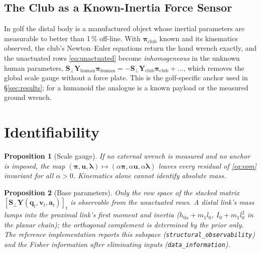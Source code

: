 \documentclass[11pt,a4paper]{article}
\newtheorem{proposition}{Proposition}
\newcommand{\bq}{\mathbf{q}}
\newcommand{\bv}{\mathbf{v}}
\newcommand{\ba}{\mathbf{a}}
\newcommand{\bu}{\mathbf{u}}
\newcommand{\bY}{\mathbf{Y}}
\newcommand{\bS}{\mathbf{S}}
\newcommand{\bpi}{\boldsymbol{\pi}}
\newcommand{\blambda}{\boldsymbol{\lambda}}
\begin{document}
\subsection{The Club as a Known-Inertia Force Sensor}
In golf the distal body is a manufactured object whose inertial parameters are
measurable to better than 1\,\% off-line.  With $\bpi_{\mathrm{club}}$ known
and its kinematics observed, the club's Newton--Euler equations return the
hand wrench exactly, and the unactuated rows \eqref{eq:unactuated} become
\emph{inhomogeneous} in the unknown human parameters,
$\bS_\perp\bY_{\mathrm{human}}\bpi_{\mathrm{human}}=-\bS_\perp\bY_{\mathrm{club}}\bpi_{\mathrm{club}}+\dots$,
which removes the global scale gauge without a force plate.  This is the
golf-specific anchor used in \S\ref{sec:results}; for a humanoid the analogue
is a known payload or the measured ground wrench.

\section{Identifiability}
\label{sec:identifiability}

\begin{proposition}[Scale gauge]
If no external wrench is measured and no anchor is imposed, the map
$(\bpi,\bu,\blambda)\mapsto(\alpha\bpi,\alpha\bu,\alpha\blambda)$ leaves every
residual of \eqref{eq:eom} invariant for all $\alpha>0$.  Kinematics alone
cannot identify absolute mass.
\end{proposition}

\begin{proposition}[Base parameters]
Only the row space of the stacked matrix
$[\bS_\perp\bY(\bq_t,\bv_t,\ba_t)]_t$ is observable from the unactuated rows.
A distal link's mass lumps into the proximal link's first moment and inertia
($h_{0x}+m_1 l_0$, $I_{0}+m_1 l_0^2$ in the planar chain); the orthogonal
complement is determined by the prior only.  The reference implementation
reports this subspace (\texttt{structural\_observability}) and the Fisher
information after eliminating inputs (\texttt{data\_information}).
\end{proposition}
\end{document}
